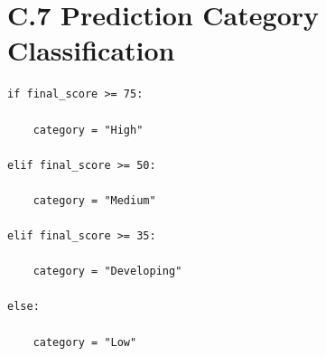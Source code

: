 \documentclass[12pt,a4paper]{report}
\begin{document}
\vspace{0.3cm}

\section*{C.7 Prediction Category Classification}

\begin{lstlisting}[caption={Prediction Category Classification}]
if final_score >= 75:

    category = "High"

elif final_score >= 50:

    category = "Medium"

elif final_score >= 35:

    category = "Developing"

else:

    category = "Low"
\end{lstlisting}

\end{document}
